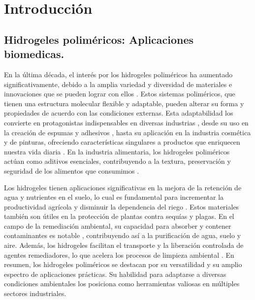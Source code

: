
\chapter{Introducci\'on}
\label{Chapter1} %



\section{Hidrogeles polim\'ericos: Aplicaciones biomedicas.} 

En la \'ultima d\'ecada, el inter\'es por los hidrogeles polim\'ericos ha aumentado significativamente, debido a la amplia variedad y diversidad de materiales e innovaciones que se pueden lograr con ellos .
Estos sistemas polim\'ericos, que tienen una estructura molecular flexible y adaptable, pueden alterar su forma y propiedades de acuerdo con las condiciones externas.
Esta adaptabilidad los convierte en protagonistas indispensables en diversas industrias \cite{zhu2022review}, desde su uso en la creaci\'on de espumas y adhesivos \cite{wu2021review, chowdhury2019novel}, hasta su aplicaci\'on en la industria cosm\'etica y de pinturas, ofreciendo caracter\'isticas singulares a productos que enriquecen nuestra vida diaria \cite{hirst2019fundamentals}.
En la industria alimentaria, los hidrogeles polim\'ericos act\'uan como aditivos esenciales, contribuyendo a la textura, preservaci\'on y seguridad de los alimentos que consumimos \cite{kwok2019microgel}.

Los hidrogeles tienen aplicaciones significativas en la mejora de la retenci\'on de agua y nutrientes en el suelo, lo cual es fundamental para incrementar la productividad agr\'icola y disminuir la dependencia del riego \cite{el2004radiation}. Estos materiales tambi\'en son \'utiles en la protecci\'on de plantas contra sequ\'ias y plagas.
En el campo de la remediaci\'on ambiental, su capacidad para absorber y contener contaminantes es notable \cite{perez2018using,perez2019molecular}, contribuyendo as\'i a la purificaci\'on de agua, suelo y aire. Adem\'as, los hidrogeles facilitan el transporte y la liberaci\'on controlada de agentes remediadores, lo que acelera los procesos de limpieza ambiental \cite{mehrotra2021use}.
En resumen, los hidrogeles polim\'ericos se destacan por su versatilidad y su amplio espectro de aplicaciones pr\'acticas. Su habilidad para adaptarse a diversas condiciones ambientales los posiciona como herramientas valiosas en m\'ultiples sectores industriales.


